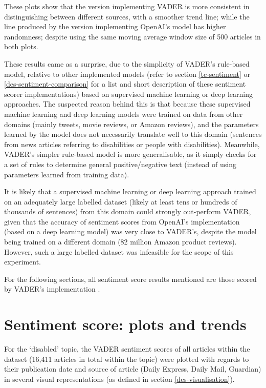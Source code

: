 \documentclass{report}
\begin{document}
These plots show that the version implementing VADER is more consistent in distinguishing between different sources, with a smoother trend line; while the line produced by the version implementing OpenAI's model has higher randomness; despite using the same moving average window size of 500 articles in both plots.

These results came as a surprise, due to the simplicity of VADER's rule-based model, relative to other implemented models (refer to section \ref{tc-sentiment} or \ref{des-sentiment-comparison} for a list and short description of these sentiment scorer implementations) based on supervised machine learning or deep learning approaches.
The suspected reason behind this is that because these supervised machine learning and deep learning models were trained on data from other domains (mainly tweets, movie reviews, or Amazon reviews), and the parameters learned by the model does not necessarily translate well to this domain (sentences from news articles referring to disabilities or people with disabilities). 
Meanwhile, VADER's simpler rule-based model is more generalisable, as it simply checks for a set of rules to determine general positive/negative text (instead of using parameters learned from training data).

It is likely that a supervised machine learning or deep learning approach trained on an adequately large labelled dataset (likely at least tens or hundreds of thousands of sentences) from this domain could strongly out-perform VADER, given that the accuracy of sentiment scores from OpenAI's implementation (based on a deep learning model) was very close to VADER's, despite the model being trained on a different domain (82 million Amazon product reviews). 
However, such a large labelled dataset was infeasible for the scope of this experiment.

For the following sections, all sentiment score results mentioned are those scored by VADER's implementation \cite{VADER}.

\section{Sentiment score: plots and trends} \label{Sentiment score: plots and trends}
For the `disabled' topic, the VADER sentiment scores of all articles within the dataset (16,411 articles in total within the topic) were plotted with regards to their publication date and source of article (Daily Express, Daily Mail, Guardian) in several visual representations (as defined in section \ref{des-visualisation}).
\end{document}
